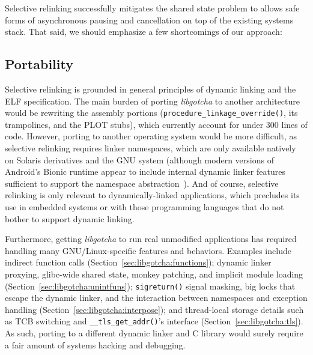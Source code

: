 Selective relinking successfully mitigates the shared state problem to allows safe
forms of asynchronous pausing and cancellation on top of the existing systems stack.
That said, we should emphasize a few shortcomings of our approach:


\subsection{Portability}

Selective relinking is grounded in general principles of dynamic linking and the ELF
specification.  The main burden of porting \textit{libgotcha} to another architecture
would be rewriting the assembly portions (\texttt{procedure\_linkage\_override()},
its trampolines, and the PLOT stubs), which currently account for under 300 lines of
code.  However, porting to another operating system would be more difficult, as
selective relinking requires linker namespaces, which are only available natively on
Solaris derivatives and the GNU system (although modern versions of Android's Bionic
runtime appear to include internal dynamic linker features sufficient to support the
namespace abstraction~\cite{www-bionic-bypass}).  And of course, selective relinking
is only relevant to dynamically-linked applications, which precludes its use in
embedded systems or with those programming languages that do not bother to support
dynamic linking.

Furthermore, getting \textit{libgotcha} to run real unmodified applications has
required handling many GNU/Linux-specific features and behaviors.  Examples include
indirect function calls (Section~\ref{sec:libgotcha:functions}); dynamic linker
proxying, glibc-wide shared state, monkey patching, and implicit module loading
(Section~\ref{sec:libgotcha:unintfuns}); \texttt{sigreturn()} signal masking, big
locks that escape the dynamic linker, and the interaction between namespaces and
exception handling (Section~\ref{sec:libgotcha:interpose}); and thread-local storage
details such as TCB switching and \texttt{\_\_tls\_get\_addr()}'s interface
(Section~\ref{sec:libgotcha:tls}).  As such, porting to a different dynamic linker
and C library would surely require a fair amount of systems hacking and debugging.

